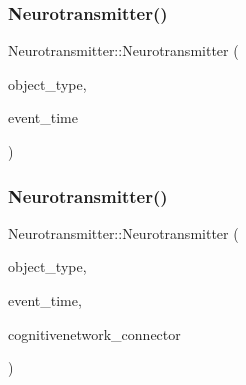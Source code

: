 \mbox{\label{classNeurotransmitter_ac1c768a2769536a8a16569ae0dde1671}} 
\subsubsection{\texorpdfstring{Neurotransmitter()}{Neurotransmitter()}\hspace{0.1cm}{\footnotesize\ttfamily [3/4]}}
{\footnotesize\ttfamily Neurotransmitter\+::\+Neurotransmitter (\begin{DoxyParamCaption}\item[{unsigned int}]{object\+\_\+type,  }\item[{std\+::chrono\+::time\+\_\+point$<$ \mbox{\hyperlink{universe_8h_a0ef8d951d1ca5ab3cfaf7ab4c7a6fd80}{Clock}} $>$}]{event\+\_\+time }\end{DoxyParamCaption})\hspace{0.3cm}{\ttfamily [inline]}}

\mbox{\label{classNeurotransmitter_ac9257a1b310a26eba8a08ffb4b93bb64}} 
\subsubsection{\texorpdfstring{Neurotransmitter()}{Neurotransmitter()}\hspace{0.1cm}{\footnotesize\ttfamily [4/4]}}
{\footnotesize\ttfamily Neurotransmitter\+::\+Neurotransmitter (\begin{DoxyParamCaption}\item[{unsigned int}]{object\+\_\+type,  }\item[{std\+::chrono\+::time\+\_\+point$<$ \mbox{\hyperlink{universe_8h_a0ef8d951d1ca5ab3cfaf7ab4c7a6fd80}{Clock}} $>$}]{event\+\_\+time,  }\item[{\mbox{\hyperlink{classCognitiveNetwork}{Cognitive\+Network}} \&}]{cognitivenetwork\+\_\+connector }\end{DoxyParamCaption})\hspace{0.3cm}{\ttfamily [inline]}}

\mbox{\label{classNeurotransmitter_a0ea63f67dc5a49d485b7a7034a8f7968}} 

